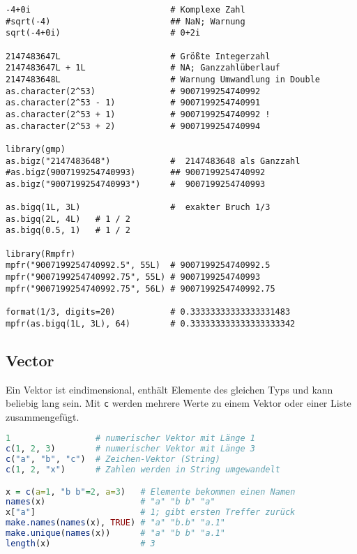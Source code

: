 \documentclass[10pt,twocolumn]{scrartcl}
\begin{document}
\begin{lstlisting}
-4+0i                            # Komplexe Zahl
#sqrt(-4)                        ## NaN; Warnung
sqrt(-4+0i)                      # 0+2i

2147483647L                      # Größte Integerzahl
2147483647L + 1L                 # NA; Ganzzahlüberlauf
2147483648L                      # Warnung Umwandlung in Double
as.character(2^53)               # 9007199254740992
as.character(2^53 - 1)           # 9007199254740991
as.character(2^53 + 1)           # 9007199254740992 !
as.character(2^53 + 2)           # 9007199254740994

library(gmp)
as.bigz("2147483648")            #  2147483648 als Ganzzahl
#as.bigz(9007199254740993)       ## 9007199254740992
as.bigz("9007199254740993")      #  9007199254740993

as.bigq(1L, 3L)                  #  exakter Bruch 1/3
as.bigq(2L, 4L)   # 1 / 2
as.bigq(0.5, 1)   # 1 / 2

library(Rmpfr)
mpfr("9007199254740992.5", 55L)  # 9007199254740992.5
mpfr("9007199254740992.75", 55L) # 9007199254740993
mpfr("9007199254740992.75", 56L) # 9007199254740992.75

format(1/3, digits=20)           # 0.33333333333333331483
mpfr(as.bigq(1L, 3L), 64)        # 0.333333333333333333342
\end{lstlisting}

\subsection{Vector}

Ein Vektor ist eindimensional, enthält Elemente des gleichen Typs und kann beliebig lang sein. Mit \lstinline|c| werden mehrere Werte zu einem Vektor oder einer Liste zusammengefügt.

\begin{lstlisting}[language=R]
1                 # numerischer Vektor mit Länge 1
c(1, 2, 3)        # numerischer Vektor mit Länge 3
c("a", "b", "c")  # Zeichen-Vektor (String)
c(1, 2, "x")      # Zahlen werden in String umgewandelt

x = c(a=1, "b b"=2, a=3)   # Elemente bekommen einen Namen
names(x)                   # "a" "b b" "a"
x["a"]                     # 1; gibt ersten Treffer zurück
make.names(names(x), TRUE) # "a" "b.b" "a.1"
make.unique(names(x))      # "a" "b b" "a.1"
length(x)                  # 3
\end{lstlisting}
\end{document}
